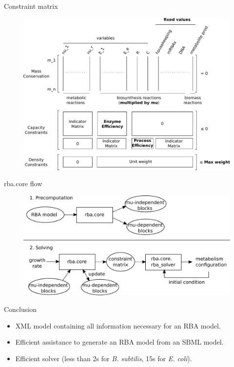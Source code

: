 \documentclass{beamer}
\begin{document}
\begin{frame}{Constraint matrix}
  \begin{figure}[!ht]
    \centering
    \includegraphics[width=\linewidth]{constraints}
  \end{figure}
\end{frame}

\begin{frame}{rba.core flow}
  \begin{figure}[!ht]
    \centering
    \includegraphics[width=\linewidth]{rbacore_summary}
  \end{figure}
\end{frame}

\begin{frame}{Conclusion}
  \begin{itemize}
    \item XML model containing all information necessary for an RBA model.
    \item Efficient assistance to generate an RBA model from an SBML model.
    \item Efficient solver
    (less than 2s for \textit{B. subtilis}, 15s for \textit{E. coli}).
  \end{itemize}
\end{frame}
\end{document}
